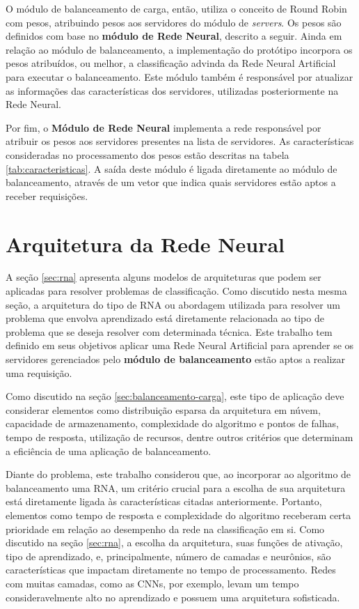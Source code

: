 O módulo de balanceamento de carga, então, utiliza o conceito de Round Robin com pesos, atribuindo pesos aos servidores do módulo de \textit{servers}. Os pesos são definidos com base no \textbf{módulo de Rede Neural}, descrito a seguir. Ainda em relação ao módulo de balanceamento, a implementação do protótipo incorpora os pesos atribuídos, ou  melhor, a classificação advinda da Rede Neural Artificial para executar o balanceamento. Este módulo também é responsável por atualizar as informações das características dos servidores, utilizadas posteriormente na Rede Neural. 

Por fim, o \textbf{Módulo de Rede Neural} implementa a rede responsável por atribuir os pesos aos servidores presentes na lista de servidores. As características consideradas no processamento dos pesos estão descritas na tabela \ref{tab:caracteristicas}. A saída deste módulo é ligada diretamente ao módulo de balanceamento, através de um vetor que indica quais servidores estão aptos a receber requisições. 

\section{Arquitetura da Rede Neural}\label{sec:ann}

A seção \ref{sec:rna} apresenta alguns modelos de arquiteturas que podem ser aplicadas para resolver problemas de classificação. Como discutido nesta mesma seção, a arquitetura do tipo de RNA ou abordagem utilizada para resolver um problema que envolva aprendizado está diretamente relacionada ao tipo de problema que se deseja resolver com determinada técnica. Este trabalho tem definido em seus objetivos aplicar uma Rede Neural Artificial para aprender se os servidores gerenciados pelo \textbf{módulo de balanceamento} estão aptos a realizar uma requisição. 

Como discutido na seção \ref{sec:balanceamento-carga}, este tipo de aplicação deve considerar elementos como distribuição esparsa da arquitetura em núvem, capacidade de armazenamento, complexidade do algoritmo e pontos de falhas, tempo de resposta, utilização de recursos, dentre outros critérios que determinam a eficiência de uma aplicação de balanceamento. 

Diante do problema, este trabalho considerou que, ao incorporar ao algoritmo de balanceamento uma RNA, um critério crucial para a escolha de sua arquitetura está diretamente ligada às características citadas anteriormente. Portanto, elementos como tempo de resposta e complexidade do algoritmo receberam certa prioridade em relação ao desempenho da rede na classificação em si. Como discutido na seção \ref{sec:rna}, a escolha da arquitetura, suas funções de ativação, tipo de aprendizado, e, principalmente, número de camadas e neurônios, são características que impactam diretamente no tempo de processamento. Redes com muitas camadas, como as CNNs, por exemplo, levam um tempo consideravelmente alto no aprendizado e possuem uma arquitetura sofisticada. 

